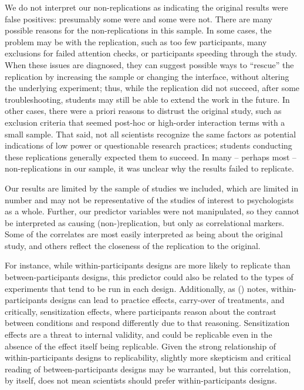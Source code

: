 \documentclass[
  english,
  a4paper,
]{article}
\begin{document}
We do not interpret our non-replications as indicating the original results were false positives: presumably some were and some were not. There are many possible reasons for the non-replications in this sample. In some cases, the problem may be with the replication, such as too few participants, many exclusions for failed attention checks, or participants speeding through the study. When these issues are diagnosed, they can suggest possible ways to ``rescue'' the replication by increasing the sample or changing the interface, without altering the underlying experiment; thus, while the replication did not succeed, after some troubleshooting, students may still be able to extend the work in the future. In other cases, there were a priori reasons to distrust the original study, such as exclusion criteria that seemed post-hoc or high-order interaction terms with a small sample. That said, not all scientists recognize the same factors as potential indications of low power or questionable research practices; students conducting these replications generally expected them to succeed. In many -- perhaps most -- non-replications in our sample, it was unclear why the results failed to replicate.

Our results are limited by the sample of studies we included, which are limited in number and may not be representative of the studies of interest to psychologists as a whole. Further, our predictor variables were not manipulated, so they cannot be interpreted as causing (non-)replication, but only as correlational markers. Some of the correlates are most easily interpreted as being about the original study, and others reflect the closeness of the replication to the original.

For instance, while within-participants designs are more likely to replicate than between-participants designs, this predictor could also be related to the types of experiments that tend to be run in each design. Additionally, as () notes, within-participants designs can lead to practice effects, carry-over of treatments, and critically, sensitization effects, where participants reason about the contrast between conditions and respond differently due to that reasoning. Sensitization effects are a threat to internal validity, and could be replicable even in the absence of the effect itself being replicable. Given the strong relationship of within-participants designs to replicability, slightly more skepticism and critical reading of between-participants designs may be warranted, but this correlation, by itself, does not mean scientists should prefer within-participants designs.
\end{document}
